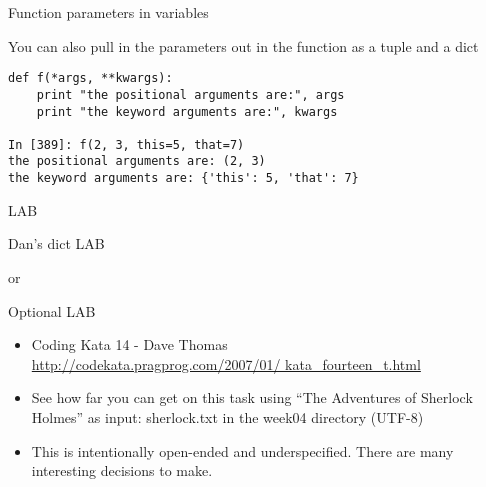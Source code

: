 \documentclass{beamer}
\begin{document}
\begin{frame}[fragile]{Function parameters in variables}

{\Large You can also pull in the parameters out in the function as a tuple and a dict
}
\begin{verbatim}
def f(*args, **kwargs):
    print "the positional arguments are:", args
    print "the keyword arguments are:", kwargs
 
In [389]: f(2, 3, this=5, that=7)
the positional arguments are: (2, 3)
the keyword arguments are: {'this': 5, 'that': 7}
\end{verbatim}

\end{frame} 





\begin{frame}{LAB}

{\LARGE Dan's dict LAB

\vfill
or

\vfill
Optional LAB
}

\begin{itemize}
  \item Coding Kata 14 - Dave Thomas \\
    \url{http://codekata.pragprog.com/2007/01/ kata_fourteen_t.html}
  \item See how far you can get on this task using “The Adventures of Sherlock Holmes” as input: sherlock.txt in the week04 directory (UTF-8)
  \item  This is intentionally open-ended and underspecified. There are many interesting decisions to make.
\end{itemize}

\end{frame}

%
%
% 
\end{document}
